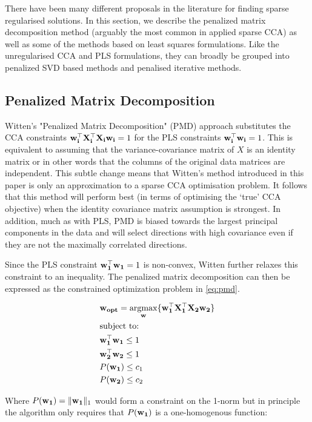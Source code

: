 There have been many different proposals in the literature for finding sparse regularised solutions. In this section, we describe the penalized matrix decomposition method (arguably the most common in applied sparse CCA) as well as some of the methods based on least squares formulations. Like the unregularised CCA and PLS formulations, they can broadly be grouped into penalized SVD based methods and penalised iterative methods.

\subsection{Penalized Matrix Decomposition}\label{sec:witten}

Witten's "Penalized Matrix Decomposition" (PMD) \cite{witten2009penalized} approach substitutes the CCA constraints $\bold{w_i^{\top}X_i^{\top}X_iw_i}=1$ for the PLS constraints $\bold{w_i^{\top}w_i}=1$. This is equivalent to assuming that the variance-covariance matrix of $X$ is an identity matrix or in other words that the columns of the original data matrices are independent. This subtle change means that Witten's method introduced in this paper is only an approximation to a sparse CCA optimisation problem. It follows that this method will perform best (in terms of optimising the `true' CCA objective) when the identity covariance matrix assumption is strongest. In addition, much as with PLS, PMD is biased towards the largest principal components in the data and will select directions with high covariance even if they are not the maximally correlated directions.

Since the PLS constraint $\bold{w_1^{\top}w_1}=1$ is non-convex, Witten further relaxes this constraint to an inequality. The penalized matrix decomposition can then be expressed as the constrained optimization problem in \ref{eq:pmd}. 

\begin{align}
    \label{eq:pmd}
    & \bold{w_{opt}}=\underset{\bold{w}}{\mathrm{argmax}}\{ \bold{w_1^{\top}X_1^{\top}X_2w_2} \}\\
    & \text{subject to:} \notag\\
    & \bold{w_1^{\top}w_1}\leq1 \notag\\
    & \bold{w_2^{\top}w_2}\leq1 \notag\\
    & P(\bold{w_1})\leq c_1 \notag\\
    &P(\bold{w_2})\leq c_2 \notag
\end{align}

Where $P(\bold{w_1})=\|\bold{w_1}\|_1$ would form a constraint on the 1-norm but in principle the algorithm only requires that $P(\bold{w_1})$ is a one-homogenous function:

